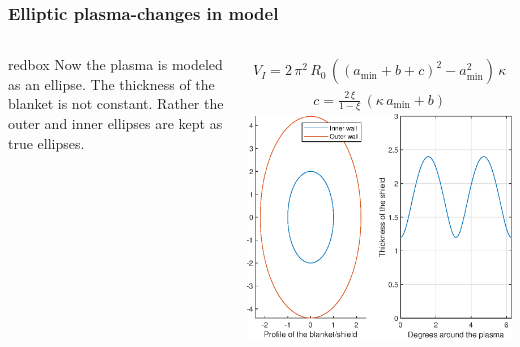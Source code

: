 \documentclass[hyperref={colorlinks=true,urlcolor=blue,linkcolor=.},aspectratio=1610,mathserif]{beamer}
\begin{document}
\begin{frame}
	\frametitle{Elliptic plasma-changes in model}
	\begin{columns}
		\begin{beamercolorbox}[sep=1em,wd=8cm]{redbox}
              Now the plasma is modeled as an ellipse.
              The thickness of the blanket is not constant. Rather the outer and inner ellipses are kept as true ellipses.
              \end{beamercolorbox}
              \begin{align}
                  V_{\si{I}}=2\,\pi^{2}\, R_{0}\,((a_{\min}+b+c)^{2}-a_{\min}^{2})\,\kappa
              \end{align}
              \begin{align}
                  c=\frac{2\,\xi}{1-\xi}\,(\kappa\, a_{\min}+b)
              \end{align}
		\centering
	    \includegraphics[width=\textwidth]{MatlabFigures/ShieldThickness/ShieldThickness.eps}
		
		
	\end{columns}
\end{frame}
\end{document}
